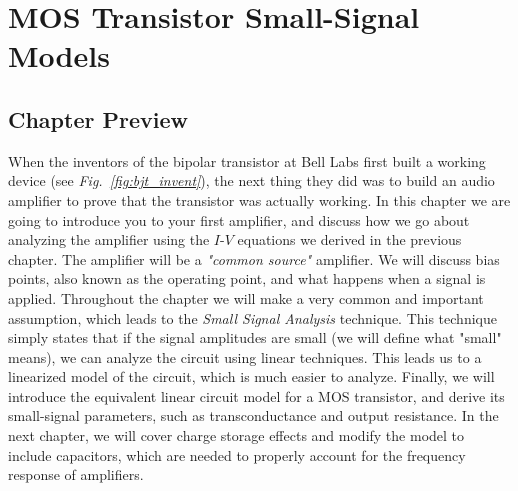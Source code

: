 \chapter{MOS Transistor Small-Signal Models}
\label{ch:ch09_mos_ss_dc}
\graphicspath{{./figs_mos_ss_dc/}}
\section{Chapter Preview}
When the inventors of the bipolar transistor at Bell Labs first built a working device (see \emph{Fig.~\ref{fig:bjt_invent}}), the next thing they did was to build an audio amplifier to prove that the transistor was actually working.  In this chapter we are going to introduce you to your first amplifier, and discuss how we go about analyzing the amplifier using the $I$-$V$ equations we derived in the previous chapter.  The amplifier will be a \emph{"common source"} amplifier.  We will discuss bias points, also known as the operating point, and what happens when a signal is applied.  Throughout the chapter we will make a very common and important assumption, which leads to the \emph{Small Signal Analysis} technique.  This technique simply states that if the signal amplitudes are small (we will define what "small" means), we can analyze the circuit using linear techniques. This leads us to a linearized model of the circuit, which is much easier to analyze.  Finally, we will introduce the equivalent linear circuit model for a MOS transistor, and derive its small-signal parameters, such as transconductance and output resistance.  In the next chapter, we will cover charge storage effects and modify the model to include capacitors, which are needed to properly account for the frequency response of amplifiers.
\newpage
